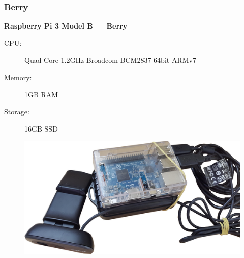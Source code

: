 \documentclass{beamer}
\begin{document}
\begin{frame}
  \frametitle{Berry}

  \textbf{Raspberry Pi 3 Model B --- Berry}
  \begin{description}
    \item[CPU:] Quad Core 1.2GHz Broadcom BCM2837 64bit ARMv7
    \item[Memory:] 1GB RAM
    \item[Storage:] 16GB SSD
  \end{description}

  \begin{figure}
    \centering\includegraphics[height=0.4\textheight]{imgs/berry.png}
  \end{figure}
\end{frame}
\end{document}
